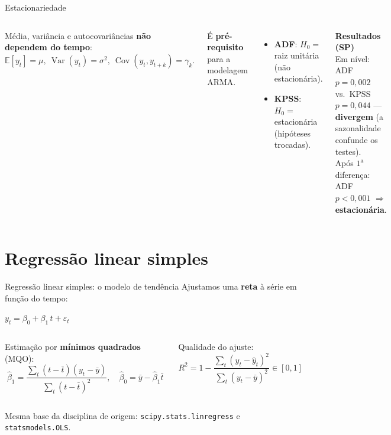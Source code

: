 \documentclass[aspectratio=169,11pt]{beamer}
\newcommand{\dest}[1]{\textcolor{emph}{\textbf{#1}}}
\newcommand{\bom}[1]{\textcolor{verde}{\textbf{#1}}}
\newcommand{\eqbox}[1]{\begin{center}\begin{tcolorbox}[enhanced,colback=white,opacityback=0.06,
   colframe=pitchred,boxrule=1.1pt,arc=2mm,coltext=white,width=0.92\linewidth,halign=center,
   top=1.4mm,bottom=1.4mm]$\displaystyle #1$\end{tcolorbox}\end{center}}
\begin{document}
\begin{frame}{Estacionariedade}
  \begin{columns}[T]
      \begin{tcolorbox}[pitchtitled,title=Estacionariedade fraca]
        \footnotesize Média, variância e autocovariâncias \dest{não dependem do tempo}:
        \[\mathbb{E}[y_t]=\mu,\ \operatorname{Var}(y_t)=\sigma^2,\ \operatorname{Cov}(y_t,y_{t+k})=\gamma_k.\]
      \end{tcolorbox}
      \footnotesize É \dest{pré-requisito} para a modelagem ARMA.
      \begin{itemize}\footnotesize
        \item \textbf{ADF}: $H_0=$ raiz unitária (não estacionária).
        \item \textbf{KPSS}: $H_0=$ estacionária (hipóteses trocadas).
      \end{itemize}
      \begin{tcolorbox}[alertbox]
        \footnotesize\textbf{Resultados (SP)}\\
        Em nível: ADF $p=0{,}002$ vs.\ KPSS $p=0{,}044$ — \dest{divergem}
        (a sazonalidade confunde os testes).\\[0.4em]
        Após $1^{\mathrm a}$ diferença: ADF $p<0{,}001$
        \bom{$\Rightarrow$ estacionária}.
      \end{tcolorbox}
  \end{columns}
\end{frame}

\section{Regressão linear simples}

\begin{frame}{Regressão linear simples: o modelo de tendência}
  Ajustamos uma \dest{reta} à série em função do tempo:
  \eqbox{y_t=\beta_0+\beta_1\,t+\varepsilon_t}
  \begin{columns}[T]
      \begin{tcolorbox}[pitchbox]
        \footnotesize Estimação por \dest{mínimos quadrados} (MQO):
        \[\hat\beta_1=\frac{\sum_t(t-\bar t)(y_t-\bar y)}{\sum_t(t-\bar t)^2},\quad
          \hat\beta_0=\bar y-\hat\beta_1\bar t\]
      \end{tcolorbox}
      \begin{tcolorbox}[pitchbox]
        \footnotesize Qualidade do ajuste:
        \[R^2=1-\frac{\sum_t(y_t-\hat y_t)^2}{\sum_t(y_t-\bar y)^2}\in[0,1]\]
      \end{tcolorbox}
  \end{columns}
  \centering\footnotesize\color{clight}
  Mesma base da disciplina de origem: \texttt{scipy.stats.linregress} e \texttt{statsmodels.OLS}.
\end{frame}
\end{document}
